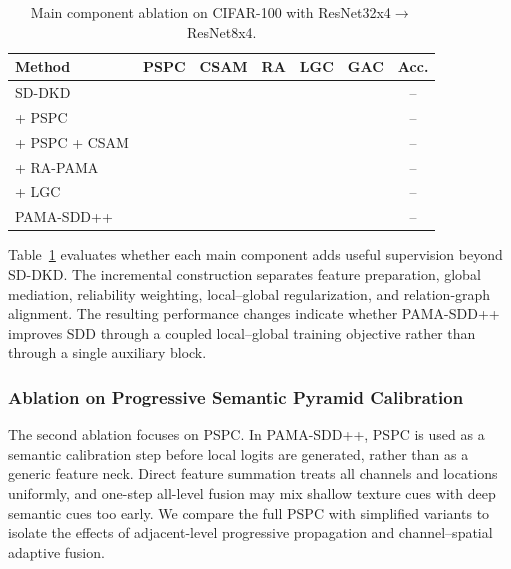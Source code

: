 \documentclass[a4paper,fleqn]{cas-dc}
\newcommand{\cmark}{\ding{51}}
\newcommand{\xmark}{\ding{55}}
\begin{document}
\begin{table}[pos=t]
\centering
\scriptsize
\caption{Main component ablation on CIFAR-100 with ResNet32x4$\rightarrow$ResNet8x4.}
\label{tab:ablation_main_components}
\setlength{\tabcolsep}{2.5pt}
\renewcommand{\arraystretch}{1.08}
\begin{tabular}{@{}lcccccc@{}}
\toprule
\textbf{Method} & \textbf{PSPC} & \textbf{CSAM} & \textbf{RA} & \textbf{LGC} & \textbf{GAC} & \textbf{Acc.} \\
\midrule
SD-DKD                 & \xmark & \xmark & \xmark & \xmark & \xmark & -- \\
+ PSPC                 & \cmark & \xmark & \xmark & \xmark & \xmark & -- \\
+ PSPC + CSAM          & \cmark & \cmark & \xmark & \xmark & \xmark & -- \\
+ RA-PAMA              & \cmark & \cmark & \cmark & \xmark & \xmark & -- \\
+ LGC                  & \cmark & \cmark & \cmark & \cmark & \xmark & -- \\
PAMA-SDD++             & \cmark & \cmark & \cmark & \cmark & \cmark & -- \\
\bottomrule
\end{tabular}
\end{table}

Table~\ref{tab:ablation_main_components} evaluates whether each main
component adds useful supervision beyond SD-DKD. The incremental construction
separates feature preparation, global mediation, reliability weighting,
local--global regularization, and relation-graph alignment. The resulting
performance changes indicate whether PAMA-SDD++ improves SDD through a
coupled local--global training objective rather than through a single
auxiliary block.

\subsubsection{Ablation on Progressive Semantic Pyramid Calibration}

The second ablation focuses on PSPC. In PAMA-SDD++, PSPC is used as a
semantic calibration step before local logits are generated, rather than as a
generic feature neck. Direct feature summation treats all channels and
locations uniformly, and one-step all-level fusion may mix shallow texture
cues with deep semantic cues too early. We compare the full PSPC with
simplified variants to isolate the effects of adjacent-level progressive
propagation and channel--spatial adaptive fusion.
\end{document}
